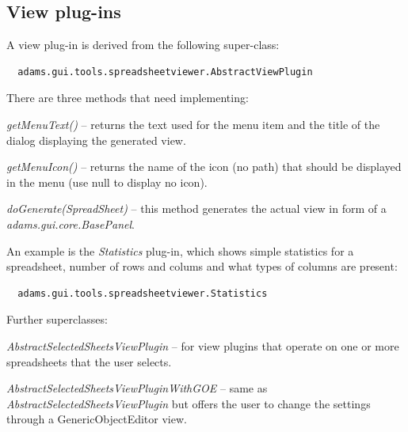 \documentclass[a4paper]{book}
\begin{document}
\subsection{View plug-ins}
A view plug-in is derived from the following super-class:
\begin{verbatim}
  adams.gui.tools.spreadsheetviewer.AbstractViewPlugin
\end{verbatim}
There are three methods that need implementing:
\begin{tight_itemize}
	\item \textit{getMenuText()} -- returns the text used for the menu item 
	and the title of the dialog displaying the generated view.
	\item \textit{getMenuIcon()} -- returns the name of the icon (no path)
	that should be displayed in the menu (use null to display no icon). 
	\item \textit{doGenerate(SpreadSheet)} -- this method generates the
	actual view in form of a \textit{adams.gui.core.BasePanel}.
\end{tight_itemize}
An example is the \textit{Statistics} plug-in, which shows simple statistics
for a spreadsheet, number of rows and colums and what types of columns
are present:
\begin{verbatim}
  adams.gui.tools.spreadsheetviewer.Statistics
\end{verbatim}
Further superclasses:
\begin{tight_itemize}
	\item \textit{AbstractSelectedSheetsViewPlugin} -- for view plugins that
	operate on one or more spreadsheets that the user selects.
	\item \textit{AbstractSelectedSheetsViewPluginWithGOE} -- same as
	\textit{AbstractSelectedSheetsViewPlugin} but offers the user to change
	the settings through a GenericObjectEditor view.
\end{tight_itemize}
\end{document}
